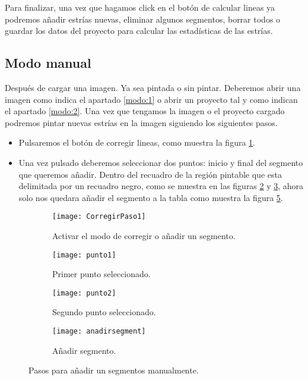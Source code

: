 Para finalizar, una vez que hagamos click en el botón de calcular lineas ya podremos añadir estrías nuevas, eliminar algunos segmentos, borrar todos o guardar los datos del proyecto para calcular las estadísticas de las estrías.


\subsection{Modo manual}
Después de cargar una imagen. Ya sea pintada o sin pintar. Deberemos abrir una imagen como indica el apartado \ref{modo:1} o abrir un proyecto tal y como indican el apartado \ref{modo:2}.
Una vez que tengamos la imagen o el proyecto cargado podremos pintar nuevas estrías en la imagen siguiendo los siguientes pasos.

\begin{itemize}
\item Pulsaremos el botón de corregir lineas, como muestra la figura \ref{fig:CorregirPaso1}.

\item Una vez pulsado deberemos seleccionar dos puntos: inicio y final del segmento que queremos añadir. 
Dentro del recuadro de la región pintable que esta delimitada por un recuadro negro, como se muestra en las figuras \ref{fig:punto1} y \ref{fig:punto2}, ahora solo nos quedara añadir el segmento a la tabla como muestra la figura \ref{fig:anadirsegment}.
\end{itemize}

\begin{figure}
	\begin{subfigure}[c]{.5\linewidth}
	\centering\large \texttt{[image: CorregirPaso1]}
	\caption{Activar el modo de corregir o añadir un segmento.}\label{fig:CorregirPaso1}
	\end{subfigure}%
	\begin{subfigure}[c]{.5\linewidth}
	\centering\large \texttt{[image: punto1]}
	\caption{Primer punto seleccionado.}\label{fig:punto1}
	\end{subfigure}%
	
	\begin{subfigure}[c]{.5\linewidth}
	\centering\large \texttt{[image: punto2]}
	\caption{Segundo punto seleccionado.}\label{fig:punto2}
	\end{subfigure}%
	\begin{subfigure}[c]{.5\linewidth}
	\centering\large \texttt{[image: anadirsegment]}
	\caption{Añadir segmento.}\label{fig:anadirsegment}
	\end{subfigure}%
	\caption{Pasos para añadir un segmentos manualmente.}
\end{figure}

